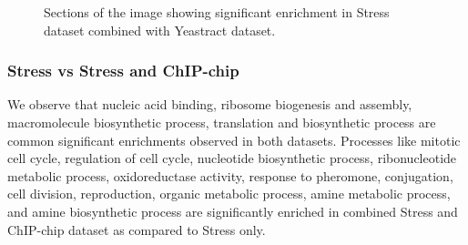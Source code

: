 \begin{figure}[p]
\centering
{}
\label{fig:maxent_stress_yt_enrich}
\caption{Sections of the image showing significant enrichment in Stress dataset combined with Yeastract dataset.}
\end{figure}

\subsubsection{Stress vs Stress and ChIP-chip}
We observe that nucleic acid binding, ribosome biogenesis and assembly, macromolecule biosynthetic process, translation and biosynthetic process are 
common significant enrichments observed in both datasets. Processes like mitotic cell cycle, regulation of cell cycle, nucleotide biosynthetic process, 
ribonucleotide metabolic process, oxidoreductase activity, response to pheromone, conjugation, cell division, reproduction, organic metabolic process, 
amine metabolic process, and amine biosynthetic process are significantly enriched in combined Stress and ChIP-chip dataset as compared to Stress only.

